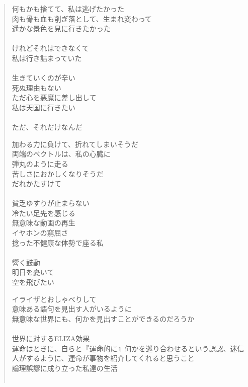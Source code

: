 \documentclass[../IHMain]{subfiles}
\begin{document}
\begin{verse}
        \newpage

        何もかも捨てて、私は逃げたかった\\
        肉も骨も血も削ぎ落として、生まれ変わって\\
        遥かな景色を見に行きたかった\\　\\

        けれどそれはできなくて\\
        私は行き詰まっていた\\　\\

        生きていくのが辛い\\
        死ぬ理由もない\\
        ただ心を悪魔に差し出して\\
        私は天国に行きたい\\　\\
        ただ、それだけなんだ

        \newpage

        加わる力に負けて、折れてしまいそうだ\\
        両端のベクトルは、私の心臓に\\
        弾丸のように走る\\
        苦しさにおかしくなりそうだ\\
        だれかたすけて\\　\\

        貧乏ゆすりが止まらない\\
        冷たい足先を感じる\\
        無意味な動画の再生\\
        イヤホンの窮屈さ\\
        捻った不健康な体勢で座る私\\　\\

        響く鼓動\\
        明日を憂いて\\
        空を飛びたい

        \newpage

        イライザとおしゃべりして\\
        意味ある語句を見出す人がいるように\\
        無意味な世界にも、何かを見出すことができるのだろうか\\　\\

        世界に対するELIZA効果\\
        運命はときに、自らと『運命的に』何かを巡り合わせるという誤認、迷信\\
        人がするように、運命が事物を紹介してくれると思うこと\\
        論理誤謬に成り立った私達の生活\\　\\
        

\end{verse}
\end{document}

